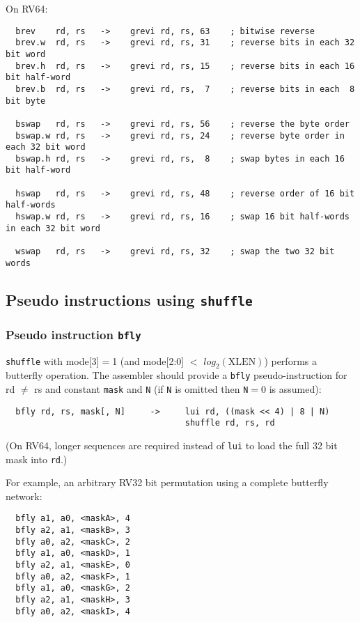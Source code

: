 On RV64:

\begin{verbatim}
  brev    rd, rs   ->    grevi rd, rs, 63    ; bitwise reverse
  brev.w  rd, rs   ->    grevi rd, rs, 31    ; reverse bits in each 32 bit word
  brev.h  rd, rs   ->    grevi rd, rs, 15    ; reverse bits in each 16 bit half-word
  brev.b  rd, rs   ->    grevi rd, rs,  7    ; reverse bits in each  8 bit byte

  bswap   rd, rs   ->    grevi rd, rs, 56    ; reverse the byte order
  bswap.w rd, rs   ->    grevi rd, rs, 24    ; reverse byte order in each 32 bit word
  bswap.h rd, rs   ->    grevi rd, rs,  8    ; swap bytes in each 16 bit half-word

  hswap   rd, rs   ->    grevi rd, rs, 48    ; reverse order of 16 bit half-words
  hswap.w rd, rs   ->    grevi rd, rs, 16    ; swap 16 bit half-words in each 32 bit word

  wswap   rd, rs   ->    grevi rd, rs, 32    ; swap the two 32 bit words
\end{verbatim}

\subsection{Pseudo instructions using {\tt shuffle}}

\subsubsection{Pseudo instruction {\tt bfly}}

{\tt shuffle} with mode[3]$=$1 (and mode[2:0] $<$ $log_2(\textrm{XLEN})$) performs
a butterfly operation. The assembler should provide a {\tt bfly} pseudo-instruction
for rd $\neq$ rs and constant {\tt mask} and {\tt N} (if {\tt N} is omitted then
{\tt N}$=$0 is assumed):

\begin{verbatim}
  bfly rd, rs, mask[, N]     ->     lui rd, ((mask << 4) | 8 | N)
                                    shuffle rd, rs, rd
\end{verbatim}

(On RV64, longer sequences are required instead of {\tt lui} to load the full
32 bit mask into {\tt rd}.)

For example, an arbitrary RV32 bit permutation using a complete butterfly network:

\begin{verbatim}
  bfly a1, a0, <maskA>, 4
  bfly a2, a1, <maskB>, 3
  bfly a0, a2, <maskC>, 2
  bfly a1, a0, <maskD>, 1
  bfly a2, a1, <maskE>, 0
  bfly a0, a2, <maskF>, 1
  bfly a1, a0, <maskG>, 2
  bfly a2, a1, <maskH>, 3
  bfly a0, a2, <maskI>, 4
\end{verbatim}


